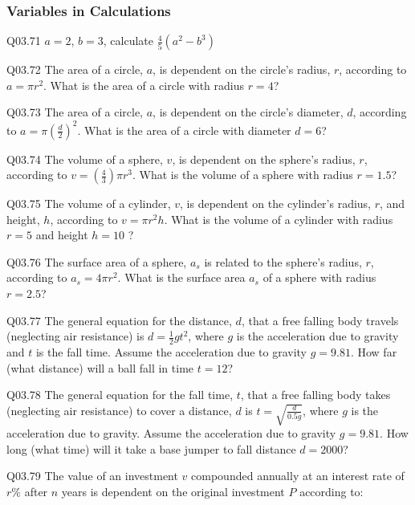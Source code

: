 \documentclass{book}
\newenvironment{problems}{}{}  %
\begin{document}
    




    
        \begin{problems}
        \hypertarget{variables-in-calculations}{%
\subsubsection{Variables in
Calculations}\label{variables-in-calculations}}

Q03.71 \(a = 2\), \(b = 3\), calculate \(\frac{4}{5}(a^2 - b^3)\)

Q03.72 The area of a circle, \(a\), is dependent on the circle's radius,
\(r\), according to \(a=\pi r^2\). What is the area of a circle with
radius \(r=4\)?

Q03.73 The area of a circle, \(a\), is dependent on the circle's
diameter, \(d\), according to \(a=\pi (\frac{d}{2})^2\). What is the
area of a circle with diameter \(d=6\)?

Q03.74 The volume of a sphere, \(v\), is dependent on the sphere's
radius, \(r\), according to \(v=(\frac{4}{3})\pi r^3\). What is the
volume of a sphere with radius \(r=1.5\)?

Q03.75 The volume of a cylinder, \(v\), is dependent on the cylinder's
radius, \(r\), and height, \(h\), according to \(v=\pi r^2 h\). What is
the volume of a cylinder with radius \(r=5\) and height \(h=10\) ?

Q03.76 The surface area of a sphere, \(a_s\) is related to the sphere's
radius, \(r\), according to \(a_s=4\pi r^2\). What is the surface area
\(a_s\) of a sphere with radius \(r=2.5\)?

Q03.77 The general equation for the distance, \(d\), that a free falling
body travels (neglecting air resistance) is \(d = \frac{1}{2}gt^2\),
where \(g\) is the acceleration due to gravity and \(t\) is the fall
time. Assume the acceleration due to gravity \(g = 9.81\). How far (what
distance) will a ball fall in time \(t = 12\)?

Q03.78 The general equation for the fall time, \(t\), that a free
falling body takes (neglecting air resistance) to cover a distance,
\(d\) is \(t = \sqrt{\frac{d}{0.5g}}\), where \(g\) is the acceleration
due to gravity. Assume the acceleration due to gravity \(g = 9.81\). How
long (what time) will it take a base jumper to fall distance
\(d = 2000\)?

Q03.79 The value of an investment \(v\) compounded annually at an
interest rate of \(r\%\) after \(n\) years is dependent on the original
investment \(P\) according to:


\end{problems}
\end{document}
